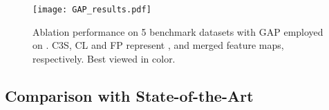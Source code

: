 \documentclass[10pt,twocolumn,letterpaper]{article}
\begin{document}
\begin{figure}[t]
\begin{center}
   \texttt{[image: GAP\_results.pdf]}
\end{center}
   \caption{Ablation performance on 5 benchmark datasets with GAP employed on . C3S, CL and FP represent ,  and merged feature maps, respectively. Best viewed in color.}
\label{fig:gapresults}
\end{figure}







\subsection{Comparison with State-of-the-Art}
\label{sec:rslt}
\end{document}
